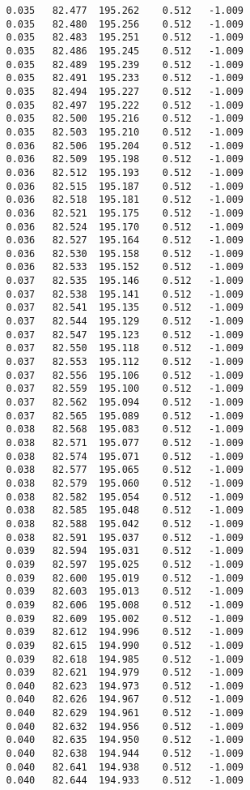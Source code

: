 \begin{verbatim}
   0.035   82.477  195.262    0.512   -1.009
   0.035   82.480  195.256    0.512   -1.009
   0.035   82.483  195.251    0.512   -1.009
   0.035   82.486  195.245    0.512   -1.009
   0.035   82.489  195.239    0.512   -1.009
   0.035   82.491  195.233    0.512   -1.009
   0.035   82.494  195.227    0.512   -1.009
   0.035   82.497  195.222    0.512   -1.009
   0.035   82.500  195.216    0.512   -1.009
   0.035   82.503  195.210    0.512   -1.009
   0.036   82.506  195.204    0.512   -1.009
   0.036   82.509  195.198    0.512   -1.009
   0.036   82.512  195.193    0.512   -1.009
   0.036   82.515  195.187    0.512   -1.009
   0.036   82.518  195.181    0.512   -1.009
   0.036   82.521  195.175    0.512   -1.009
   0.036   82.524  195.170    0.512   -1.009
   0.036   82.527  195.164    0.512   -1.009
   0.036   82.530  195.158    0.512   -1.009
   0.036   82.533  195.152    0.512   -1.009
   0.037   82.535  195.146    0.512   -1.009
   0.037   82.538  195.141    0.512   -1.009
   0.037   82.541  195.135    0.512   -1.009
   0.037   82.544  195.129    0.512   -1.009
   0.037   82.547  195.123    0.512   -1.009
   0.037   82.550  195.118    0.512   -1.009
   0.037   82.553  195.112    0.512   -1.009
   0.037   82.556  195.106    0.512   -1.009
   0.037   82.559  195.100    0.512   -1.009
   0.037   82.562  195.094    0.512   -1.009
   0.037   82.565  195.089    0.512   -1.009
   0.038   82.568  195.083    0.512   -1.009
   0.038   82.571  195.077    0.512   -1.009
   0.038   82.574  195.071    0.512   -1.009
   0.038   82.577  195.065    0.512   -1.009
   0.038   82.579  195.060    0.512   -1.009
   0.038   82.582  195.054    0.512   -1.009
   0.038   82.585  195.048    0.512   -1.009
   0.038   82.588  195.042    0.512   -1.009
   0.038   82.591  195.037    0.512   -1.009
   0.039   82.594  195.031    0.512   -1.009
   0.039   82.597  195.025    0.512   -1.009
   0.039   82.600  195.019    0.512   -1.009
   0.039   82.603  195.013    0.512   -1.009
   0.039   82.606  195.008    0.512   -1.009
   0.039   82.609  195.002    0.512   -1.009
   0.039   82.612  194.996    0.512   -1.009
   0.039   82.615  194.990    0.512   -1.009
   0.039   82.618  194.985    0.512   -1.009
   0.039   82.621  194.979    0.512   -1.009
   0.040   82.623  194.973    0.512   -1.009
   0.040   82.626  194.967    0.512   -1.009
   0.040   82.629  194.961    0.512   -1.009
   0.040   82.632  194.956    0.512   -1.009
   0.040   82.635  194.950    0.512   -1.009
   0.040   82.638  194.944    0.512   -1.009
   0.040   82.641  194.938    0.512   -1.009
   0.040   82.644  194.933    0.512   -1.009

\end{verbatim}
